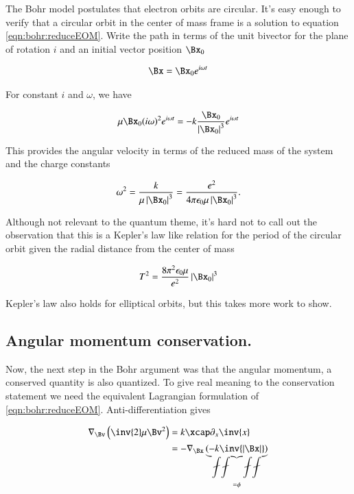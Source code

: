 The Bohr model postulates that electron orbits are circular.  It's easy enough to verify that a circular orbit in the center of mass frame is a solution to equation
\ref{eqn:bohr:reduceEOM}.   Write the path in terms of the unit bivector for the plane of rotation $i$ and an initial vector position $\Bx_0$

\begin{align}\label{eqn:bohr:circular}
\Bx = \Bx_0 e^{i \omega t}
\end{align}

For constant $i$ and $\omega$, we have

\begin{align*}
\mu \Bx_0 (i\omega)^2 e^{i\omega t} = - k \frac{\Bx_0}{\Abs{\Bx_0}^3} e^{i\omega t}
\end{align*}

This provides the 
angular velocity in terms of the reduced mass of the system and the charge constants

\begin{align}\label{eqn:bohr:omegaSquared}
\omega^2 = \frac{k}{\mu \Abs{\Bx_0}^3} = \frac{e^2}{4 \pi \epsilon_0 \mu \Abs{\Bx_0}^3}.
\end{align}

Although not relevant to the quantum theme, it's hard not to call out the observation that this is
a Kepler's law like relation for the period of the circular orbit given the radial distance from the center of mass

\begin{align*}
T^2 = \frac{8 \pi^2 \epsilon_0 \mu}{e^2} \Abs{\Bx_0}^3
\end{align*}

Kepler's law also holds for elliptical orbits, but this takes more work to show.

\subsection{Angular momentum conservation. }

Now, the next step in the Bohr argument was that the angular momentum, a conserved quantity is also quantized.  To give real
meaning to the conservation statement we need the equivalent Lagrangian formulation of \ref{eqn:bohr:reduceEOM}.  Anti-differentiation
gives

\begin{align*}
\grad_\Bv \left( \inv{2} \mu \Bv^2 \right) 
&= k \xcap \partial_x \inv{x} \\
&= - \grad_\Bx \underbrace{\left(- k\inv{\Abs{\Bx}}\right)}_{=\phi}
\end{align*}

